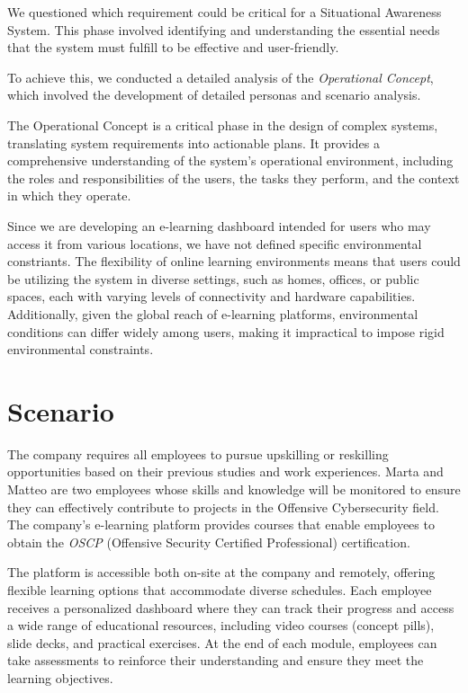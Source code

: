 We questioned which requirement could be critical for a Situational Awareness System. This phase involved identifying and understanding the essential needs that the system must fulfill to be effective and user-friendly. 

To achieve this, we conducted a detailed analysis of the \textit{Operational Concept}, which involved the development of detailed personas and scenario analysis. 

The Operational Concept is a critical phase in the design of complex systems, translating system requirements into actionable plans. 
It provides a comprehensive understanding of the system's operational environment, including the roles and responsibilities of the users, the tasks they perform, and the context in which they operate.

Since we are developing an e-learning dashboard intended for users who may access it from various locations, we have not defined specific environmental constriants. The flexibility of online learning environments means that users could be utilizing the system in diverse settings, such as homes, offices, or public spaces, each with varying levels of connectivity and hardware capabilities. Additionally, given the global reach of e-learning platforms, environmental conditions can differ widely among users, making it impractical to impose rigid environmental constraints.

\section{Scenario}
The company requires all employees to pursue upskilling or reskilling opportunities based on their previous studies and work experiences. Marta and Matteo are two employees whose skills and knowledge will be monitored to ensure they can effectively contribute to projects in the Offensive Cybersecurity field. The company’s e-learning platform provides courses that enable employees to obtain the \textit{OSCP} (Offensive Security Certified Professional) certification.

The platform is accessible both on-site at the company and remotely, offering flexible learning options that accommodate diverse schedules. Each employee receives a personalized dashboard where they can track their progress and access a wide range of educational resources, including video courses (concept pills), slide decks, and practical exercises. At the end of each module, employees can take assessments to reinforce their understanding and ensure they meet the learning objectives.

